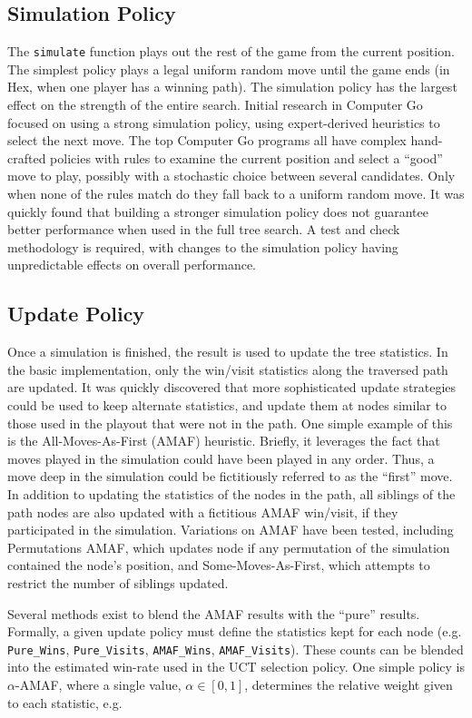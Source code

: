 \documentclass[11pt]{report}
\begin{document}
\subsection{Simulation Policy}
The \texttt{simulate} function plays out the rest of the game from the current position. The simplest policy plays a legal uniform random move until the game ends (in Hex, when one player has a winning path). The simulation policy has the largest effect on the strength of the entire search. Initial research in Computer Go focused on using a strong simulation policy, using expert-derived heuristics to select the next move. The top Computer Go programs all have complex hand-crafted policies with rules to examine the current position and select a ``good'' move to play, possibly with a stochastic choice between several candidates. Only when none of the rules match do they fall back to a uniform random move. It was quickly found that building a stronger simulation policy does not guarantee better performance when used in the full tree search. A test and check methodology is required, with changes to the simulation policy having unpredictable effects on overall performance.

\subsection{Update Policy}
Once a simulation is finished, the result is used to update the tree statistics. In the basic implementation, only the win/visit statistics along the traversed path are updated. It was quickly discovered that more sophisticated update strategies could be used to keep alternate statistics, and update them at nodes similar to those used in the playout that were not in the path. One simple example of this is the All-Moves-As-First (AMAF) heuristic. Briefly, it leverages the fact that moves played in the simulation could have been played in any order. Thus, a move deep in the simulation could be fictitiously referred to as the ``first'' move. In addition to updating the statistics of the nodes in the path, all siblings of the path nodes are also updated with a fictitious AMAF win/visit, if they participated in the simulation. Variations on AMAF have been tested, including Permutations AMAF, which updates node if any permutation of the simulation contained the node's position, and Some-Moves-As-First, which attempts to restrict the number of siblings updated.

Several methods exist to blend the AMAF results with the ``pure'' results. Formally, a given update policy must define the statistics kept for each node (e.g. \texttt{Pure\_Wins}, \texttt{Pure\_Visits}, \texttt{AMAF\_Wins}, \texttt{AMAF\_Visits}). These counts can be blended into the estimated win-rate used in the UCT selection policy. One simple policy is $\alpha$-AMAF, where a single value, $\alpha \in [0, 1]$, determines the relative weight given to each statistic, e.g.
\end{document}
